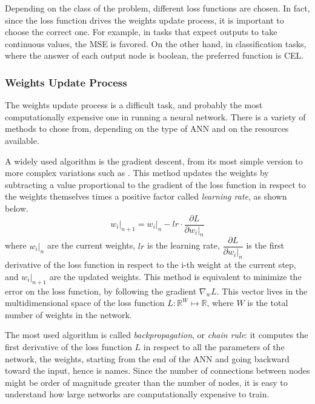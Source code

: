 
Depending on the class of the problem, different loss functions are chosen.
In fact, since the loss function drives the weights update process, it is important to choose the correct one.
For example, in tasks that expect outputs to take continuous values, the \acs{MSE} is favored.
On the other hand, in classification tasks, where the answer of each output node is boolean, the preferred function is \acs{CEL}.

\subsubsection{Weights Update Process}
\label{sssec:Weights_Update_Process}

The weights update process is a difficult task, and probably the most computationally expensive one in running a neural network.
There is a variety of methods to chose from, depending on the type of \acs{ANN} and on the resources available.

A widely used algorithm is the gradient descent, from its most simple version to more complex variations such as .
This method updates the weights by subtracting a value proportional to the gradient of the loss function in respect to the weights themselves times a positive factor called \textit{learning rate}, as shown below.
\begin{equation}
	\left.w_i\right|_{n+1} = \left.w_i\right|_n - lr \cdot \frac{\partial L}{\partial \left.w_i\right|_n}
\end{equation}
where $\left.w_i\right|_{n}$ are the current weights, $lr$ is the learning rate, $\dfrac{\partial L}{\partial \left.w_i\right|_n}$ is the first derivative of the loss function in respect to the i-th weight at the current step, and $\left.w_i\right|_{n+1}$ are the updated weights.
This method is equivalent to minimize the error on the loss function, by following the gradient $\nabla_w L$.
This vector lives in the multidimensional space of the loss function $L:\mathbb{R}^W \mapsto \mathbb{R}$, where $W$ is the total number of weights in the network.

The most used algorithm is called \textit{backpropagation}, or \textit{chain rule}: it computes the first derivative of the loss function $L$ in respect to all the parameters of the network, the weights, starting from the end of the \acs{ANN} and going backward toward the input, hence is names.
Since the number of connections between nodes might be order of magnitude greater than the number of nodes, it is easy to understand how large networks are computationally expensive to train.

